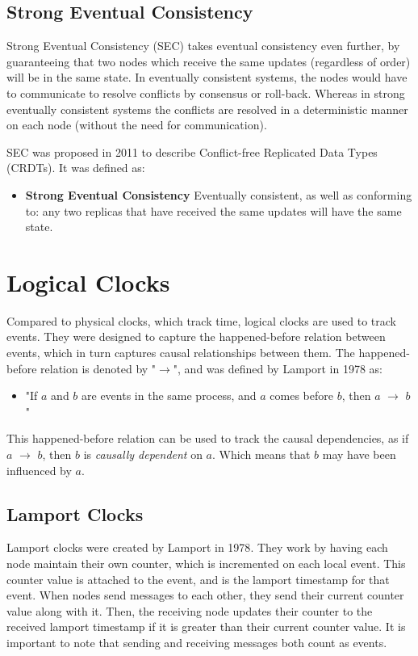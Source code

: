 \documentclass[12pt]{report}
\begin{document}
\subsection{Strong Eventual Consistency}
Strong Eventual Consistency (SEC) takes eventual consistency even further, by guaranteeing that two nodes which receive the same updates (regardless of order) will be in the same state. In eventually consistent systems, the nodes would have to communicate to resolve conflicts by consensus or roll-back. Whereas in strong eventually consistent systems the conflicts are resolved in a deterministic manner on each node (without the need for communication). \par
SEC was proposed in 2011\cite{10.1007/978-3-642-24550-3_29} to describe Conflict-free Replicated Data Types (CRDTs). It was defined as:
\begin{itemize}
    \item \textbf{Strong Eventual Consistency} Eventually consistent, as well as conforming to: any two replicas that have received the same updates will have the same state.
\end{itemize}

\section{Logical Clocks}
Compared to physical clocks, which track time, logical clocks are used to track events. They were designed to capture the happened-before relation between events, which in turn captures causal relationships between them. The happened-before relation is denoted by "$\rightarrow$", and was defined by Lamport in 1978\cite{lamport1978time} as:
\begin{itemize}
    \item "If $a$ and $b$ are events in the same
    process, and $a$ comes before $b$, then $a$ $\rightarrow$ $b$"
\end{itemize}
This happened-before relation can be used to track the causal dependencies, as if $a$ $\rightarrow$ $b$, then $b$ is \textit{causally dependent} on $a$. Which means that $b$ may have been influenced by $a$. \par 
\subsection{Lamport Clocks}
Lamport clocks were created by Lamport in 1978\cite{lamport1978time}. They work by having each node maintain their own counter, which is incremented on each local event. This counter value is attached to the event, and is the lamport timestamp for that event. When nodes send messages to each other, they send their current counter value along with it. Then, the receiving node updates their counter to the received lamport timestamp if it is greater than their current counter value. It is important to note that sending and receiving messages both count as events. \par
\end{document}
